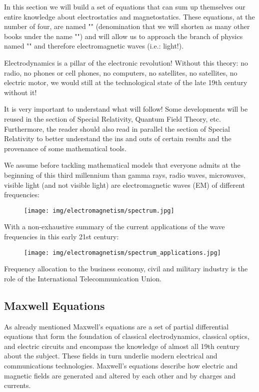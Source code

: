 	In this section we will build a set of equations that can sum up themselves our entire knowledge about electrostatics and magnetostatics. These equations, at the number of four, are named "" (denomination that we will shorten as many other books under the name "") and will allow us to approach the branch of physics named "" and therefore electromagnetic waves (i.e.: light!).
	
	Electrodynamics is a pillar of the electronic revolution! Without this theory: no radio, no phones or cell phones, no computers, no satellites, no satellites, no electric motor, we would still at the technological state of the late 19th century without it!
	\begin{tcolorbox}[title=Remark,colframe=black,arc=10pt]
	It is very important to understand what will follow! Some developments will be reused in the section of Special Relativity, Quantum Field Theory, etc. Furthermore, the reader should also read in parallel the section of Special Relativity to better understand the ins and outs of certain results and the provenance of some mathematical tools.
	\end{tcolorbox}
	We assume before tackling mathematical models that everyone admits at the beginning of this third millennium than gamma rays, radio waves, microwaves, visible light (and not visible light) are electromagnetic waves (EM) of different frequencies:
	\begin{figure}[H]
		\centering
		\texttt{[image: img/electromagnetism/spectrum.jpg]}
	\end{figure}
	With a non-exhaustive summary of the current applications of the wave frequencies in this early 21st century:
	\begin{figure}[H]
		\centering
		\texttt{[image: img/electromagnetism/spectrum\_applications.jpg]}
	\end{figure}
	Frequency allocation to the business economy, civil and military industry is the role of the International Telecommunication Union.
	
	\subsection{Maxwell Equations}\label{maxwell equations}
	As already mentioned Maxwell's equations are a set of partial differential equations that form the foundation of classical electrodynamics, classical optics, and electric circuits and encompass the knowledge of almost all 19th century about the subject. These fields in turn underlie modern electrical and communications technologies. Maxwell's equations describe how electric and magnetic fields are generated and altered by each other and by charges and currents.
	
